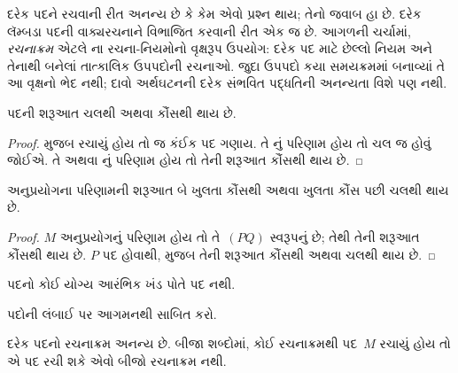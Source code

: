 \documentclass[../../../include/open-logic-section]{subfiles}
\begin{document}

દરેક પદને રચવાની રીત અનન્ય છે કે કેમ એવો પ્રશ્ન થાય; તેનો
જવાબ હા છે. દરેક લૅમ્બડા પદની વાક્યરચનાને વિભાજિત કરવાની
રીત એક જ છે. આગળની ચર્ચામાં, \emph{રચનાક્રમ} એટલે
ના રચના-નિયમોનો વૃક્ષરૂપ ઉપયોગ:
દરેક પદ માટે છેલ્લો નિયમ અને તેનાથી બનેલાં તાત્કાલિક ઉપપદોની
રચનાઓ. જુદા ઉપપદો કયા સમયક્રમમાં બનાવ્યાં તે આ વૃક્ષનો ભેદ નથી;
દાવો અર્થઘટનની દરેક સંભવિત પદ્ધતિની અનન્યતા વિશે પણ નથી.

\begin{lem}
પદની શરૂઆત ચલથી અથવા કૌંસથી થાય છે.
\end{lem}

\begin{proof}
 મુજબ રચાયું હોય તો જ કંઈક પદ ગણાય.
તે નું પરિણામ હોય તો ચલ જ હોવું જોઈએ.
તે  અથવા
નું પરિણામ હોય તો તેની શરૂઆત કૌંસથી
થાય છે.
\end{proof}

\begin{lem}
અનુપ્રયોગના પરિણામની શરૂઆત બે ખુલતા કૌંસથી અથવા ખુલતા કૌંસ
પછી ચલથી થાય છે.
\end{lem}

\begin{proof}
$M$ અનુપ્રયોગનું પરિણામ હોય તો તે~$(PQ)$ સ્વરૂપનું છે;
તેથી તેની શરૂઆત કૌંસથી થાય છે. $P$ પદ હોવાથી,
 મુજબ તેની શરૂઆત કૌંસથી અથવા ચલથી
થાય છે.
\end{proof}

\begin{lem}
પદનો કોઈ યોગ્ય આરંભિક ખંડ પોતે પદ નથી.
\end{lem}

\begin{prob}
પદોની લંબાઈ પર આગમનથી
 સાબિત કરો.
\end{prob}

\begin{prop}[અનન્ય વાંચનીયતા] 
દરેક પદનો રચનાક્રમ અનન્ય છે. બીજા શબ્દોમાં, કોઈ રચનાક્રમથી
પદ~$M$ રચાયું હોય તો એ પદ રચી શકે એવો બીજો રચનાક્રમ નથી.
\end{prop}
\end{document}
